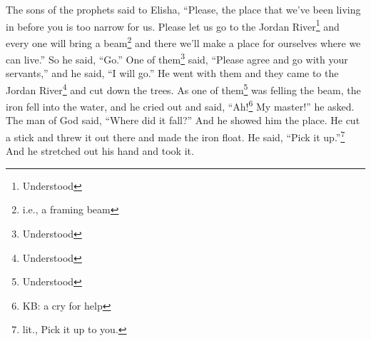 
\begin{inparaenum}
     The sons of the prophets said to Elisha, ``Please, the place that we've been living in before you is too narrow for us.%
     Please let us go to the Jordan River\footnote{Understood} and every one will bring a beam\footnote{i.e., a framing beam} and there we'll make a place for ourselves where we can live.'' So he said, ``Go.''%
     One of them\footnote{Understood} said, ``Please agree and go with your servants,'' and he said, ``I will go.''%
     He went with them and they came to the Jordan River\footnote{Understood} and cut down the trees.%
     As one of them\footnote{Understood} was felling the beam, the iron fell into the water, and he cried out and said, ``Ah!\footnote{KB: a cry for help} My master!'' he asked.%
     The man of God said, ``Where did it fall?'' And he showed him the place. He cut a stick and threw it out there and made the iron float.%
     He said, ``Pick it up.''\footnote{lit., Pick it up to you.} And he stretched out his hand and took it.%
    

\end{inparaenum}
